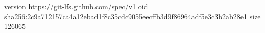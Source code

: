 version https://git-lfs.github.com/spec/v1
oid sha256:2c9a712157ca4a12ebad1f8c35cdc9055eecffb3d9f86964adf5e3c3b2ab28e1
size 126065
